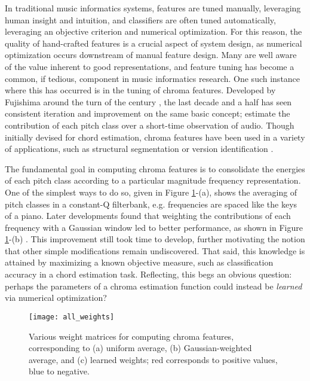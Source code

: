 In traditional music informatics systems, features are tuned manually, leveraging human insight and intuition, and classifiers are often tuned automatically, leveraging an objective criterion and numerical optimization.
For this reason, the quality of hand-crafted features is a crucial aspect of system design, as numerical optimization occurs downstream of manual feature design.
Many are well aware of the value inherent to good representations, and feature tuning has become a common, if tedious, component in music informatics research.
One such instance where this has occurred is in the tuning of chroma features.
Developed by Fujishima around the turn of the century \cite{Fujishima1999Realtime}, the last decade and a half has seen consistent iteration and improvement on the same basic concept; estimate the contribution of each pitch class over a short-time observation of audio.
Though initially devised for chord estimation, chroma features have been used in a variety of applications, such as structural segmentation \cite{Levy2007Comparison} or version identification \cite{Salamon2013Tonal}.

The fundamental goal in computing chroma features is to consolidate the energies of each pitch class according to a particular magnitude frequency representation.
One of the simplest ways to do so, given in Figure \ref{fig:all_weights}-(a), shows the averaging of pitch classes in a constant-Q filterbank, e.g. frequencies are spaced like the keys of a piano.
Later developments found that weighting the contributions of each frequency with a Gaussian window led to better performance, as shown in Figure \ref{fig:all_weights}-(b) \cite{Cho2014Improved}.
This improvement still took time to develop, further motivating the notion that other simple modifications remain undiscovered.
That said, this knowledge is attained by maximizing a known objective measure, such as classification accuracy in a chord estimation task.
Reflecting, this begs an obvious question: perhaps the parameters of a chroma estimation function could instead be \emph{learned} via numerical optimization?

\begin{figure}
\begin{centering}
\texttt{[image: all\_weights]}
\caption{Various weight matrices for computing chroma features, corresponding to (a) uniform average, (b) Gaussian-weighted average, and (c) learned weights; red corresponds to positive values, blue to negative.}
\label{fig:all_weights}
\end{centering}
\end{figure}

